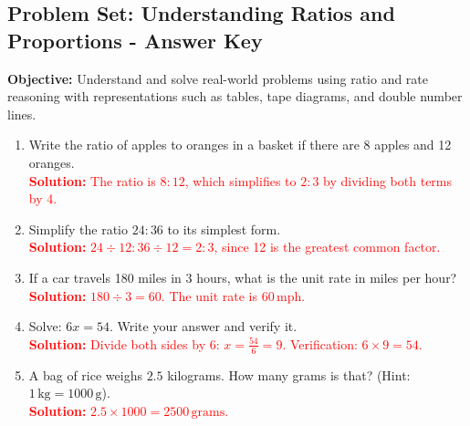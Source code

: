 \documentclass[12pt]{article}
\title{}
\date{}
\begin{document}
\subsection*{Problem Set: Understanding Ratios and Proportions - Answer Key}
\onehalfspacing

\begin{tcolorbox}[colframe=black!40, colback=gray!5, 
coltitle=black, colbacktitle=black!20, fonttitle=\bfseries\Large, 
title=Learning Objective, halign title=center, left=5pt, right=5pt, top=5pt, bottom=15pt]
\textbf{Objective:} Understand and solve real-world problems using ratio and rate reasoning with representations such as tables, tape diagrams, and double number lines.
\end{tcolorbox}

\begin{tcolorbox}[colframe=black!60, colback=white, 
coltitle=black, colbacktitle=black!15, fonttitle=\bfseries\Large, 
title=Exercises, halign title=center, left=10pt, right=10pt, top=10pt, bottom=60pt]
\begin{enumerate}[itemsep=2em]
    \item Write the ratio of apples to oranges in a basket if there are 8 apples and 12 oranges.\\
    \textcolor{red}{\textbf{Solution:} The ratio is \( 8:12 \), which simplifies to \( 2:3 \) by dividing both terms by 4.}

    \item Simplify the ratio \( 24:36 \) to its simplest form.\\
    \textcolor{red}{\textbf{Solution:} \( 24 \div 12 : 36 \div 12 = 2:3 \), since 12 is the greatest common factor.}

    \item If a car travels 180 miles in 3 hours, what is the unit rate in miles per hour?\\
    \textcolor{red}{\textbf{Solution:} \( 180 \div 3 = 60 \). The unit rate is \( 60 \, \text{mph} \).}

    \item Solve: \( 6x = 54 \). Write your answer and verify it.\\
    \textcolor{red}{\textbf{Solution:} Divide both sides by 6: \( x = \frac{54}{6} = 9 \). Verification: \( 6 \times 9 = 54 \).}

    \item A bag of rice weighs \( 2.5 \) kilograms. How many grams is that? (Hint: \( 1 \, \text{kg} = 1000 \, \text{g} \)).\\
    \textcolor{red}{\textbf{Solution:} \( 2.5 \times 1000 = 2500 \, \text{grams} \).}


\end{enumerate}
\end{tcolorbox}
\end{document}
